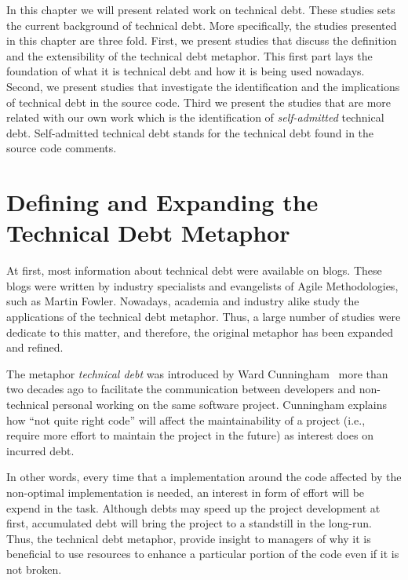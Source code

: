 
In this chapter we will present related work on technical debt. These studies sets the current background of technical debt. More specifically, the studies presented in this chapter are three fold. First, we present studies that discuss the definition and the extensibility of the technical debt metaphor. This first part lays the foundation of what it is technical debt and how it is being used nowadays. Second, we present studies that investigate the identification and the implications of technical debt in the source code. Third we present the studies that are more related with our own work which is the identification of \emph{self-admitted} technical debt. Self-admitted technical debt stands for the technical debt found in the source code comments.

\section{Defining and Expanding the Technical Debt Metaphor}
\label{defining_and_extending_technical_debt}

At first, most information about technical debt were available on blogs. These blogs were written by industry specialists and evangelists of Agile Methodologies, such as Martin Fowler. Nowadays, academia and industry alike study the applications of the technical debt metaphor. Thus, a large number of studies were dedicate to this matter, and therefore, the original metaphor has been expanded and refined.

The metaphor \textit{technical debt} was introduced by Ward Cunningham~\cite{Cunningham1992WPM} more than two decades ago to facilitate the communication between developers and non-technical personal working on the same software project. Cunningham explains how ``not quite right code'' will affect the maintainability of a project (i.e., require more effort to maintain the project in the future) as interest does on incurred debt. 

In other words, every time that a implementation around the code affected by the non-optimal implementation is needed, an interest in form of effort will be expend in the task. Although debts may speed up the project development at first, accumulated debt will bring the project to a standstill in the long-run. Thus, the technical debt metaphor, provide insight to managers of why it is beneficial to use resources to enhance a particular portion of the code even if it is not broken.

